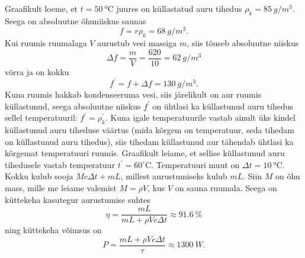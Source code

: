 \solu
Graafikult loeme, et $t=\SI{50}{\degreeCelsius}$ juures on küllastatud auru tihedus $\rho_{k}=\SI{85}{g/m^3}$. Seega on absoluutne õhuniiskus saunas
$$
f=r \rho_{k}=\SI{68}{g/m^3}.
$$
Kui ruumis ruumalaga $V$ aurustub vesi massiga $m$, siis tõuseb absoluutne niiskus
$$
\Delta f=\frac{m}{V}=\frac{620}{10}=\SI{62}{g/m^3}
$$
võrra ja on kokku
$$
f^{\prime}=f+\Delta f=\SI{130}{g/m^3}.
$$
Kuna ruumis hakkab kondenseeruma vesi, siis järelikult on aur ruumis küllastunud, seega absoluutne niiskus $f^{\prime}$ on ühtlasi ka küllastunud auru tihedus sellel temperatuuril:
$f^{\prime}=\rho_{k}^{\prime} .$ Kuna igale temperatuurile vastab ainult üks kindel küllastunud auru tiheduse väärtus (mida kõrgem on temperatuur, seda tihedam on küllastunud auru tihedus), siis tihedam küllastunud aur tähendab ühtlasi ka kõrgemat temperatuuri ruumis. Graafikult leiame, et sellise küllastunud auru tihedusele vastab temperatuur $t^{\prime}=60^{\circ} \mathrm{C}$. Temperatuuri muut on $\Delta t=\SI{10}{\degreeCelsius}$. Kokku kulub sooja $M c \Delta t+m L$, millest aurustumiseks kulub $m L$. Siin $M$ on õhu mass, mille me leiame valemist $M=\rho V$, kus $V$ on sauna ruumala. Seega on küttekeha kasutegur aurustumise suhtes
$$
\eta=\frac{m L}{m L+\rho V c \Delta t} \approx \SI{91,6}{\%}
$$
ning küttekeha võimsus on
$$
P=\frac{m L+\rho V c \Delta t}{\tau} \approx \SI{1300}{W}.
$$
\probend